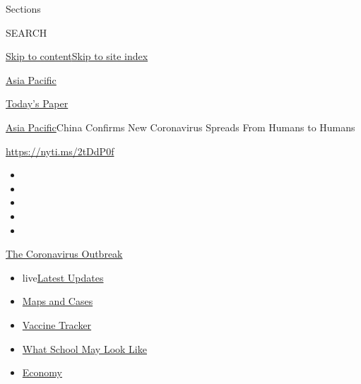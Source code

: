 Sections

SEARCH

\protect\hyperlink{site-content}{Skip to
content}\protect\hyperlink{site-index}{Skip to site index}

\href{https://www.nytimes.com/section/world/asia}{Asia Pacific}

\href{https://myaccount.nytimes.com/auth/login?response_type=cookie\&client_id=vi}{}

\href{https://www.nytimes.com/section/todayspaper}{Today's Paper}

\href{/section/world/asia}{Asia Pacific}\textbar{}China Confirms New
Coronavirus Spreads From Humans to Humans

\url{https://nyti.ms/2tDdP0f}

\begin{itemize}
\item
\item
\item
\item
\item
\end{itemize}

\href{https://www.nytimes.com/news-event/coronavirus?action=click\&pgtype=Article\&state=default\&region=TOP_BANNER\&context=storylines_menu}{The
Coronavirus Outbreak}

\begin{itemize}
\tightlist
\item
  live\href{https://www.nytimes.com/2020/08/02/world/coronavirus-updates.html?action=click\&pgtype=Article\&state=default\&region=TOP_BANNER\&context=storylines_menu}{Latest
  Updates}
\item
  \href{https://www.nytimes.com/interactive/2020/us/coronavirus-us-cases.html?action=click\&pgtype=Article\&state=default\&region=TOP_BANNER\&context=storylines_menu}{Maps
  and Cases}
\item
  \href{https://www.nytimes.com/interactive/2020/science/coronavirus-vaccine-tracker.html?action=click\&pgtype=Article\&state=default\&region=TOP_BANNER\&context=storylines_menu}{Vaccine
  Tracker}
\item
  \href{https://www.nytimes.com/interactive/2020/07/29/us/schools-reopening-coronavirus.html?action=click\&pgtype=Article\&state=default\&region=TOP_BANNER\&context=storylines_menu}{What
  School May Look Like}
\item
  \href{https://www.nytimes.com/live/2020/07/31/business/stock-market-today-coronavirus?action=click\&pgtype=Article\&state=default\&region=TOP_BANNER\&context=storylines_menu}{Economy}
\end{itemize}

